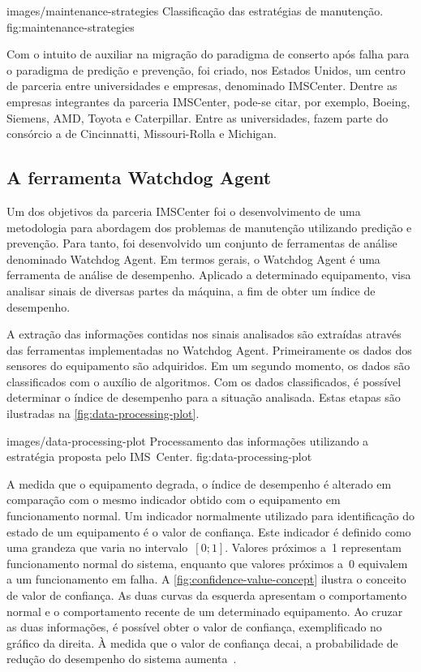     {images/maintenance-strategies}
    {Classificação das estratégias de manutenção.}
    {fig:maintenance-strategies}

Com o intuito de auxiliar na migração do paradigma de conserto após falha para o paradigma de
predição e prevenção, foi criado, nos Estados Unidos, um centro de parceria entre universidades e
empresas, denominado \gls{IMSCenter}. Dentre as empresas integrantes da parceria \gls{IMSCenter},
pode-se citar, por exemplo, Boeing, Siemens, AMD, Toyota e Caterpillar. Entre as universidades,
fazem parte do consórcio a de Cincinnatti, Missouri-Rolla e Michigan.


\subsection{A ferramenta Watchdog Agent}

Um dos objetivos da parceria \gls{IMSCenter} foi o desenvolvimento de uma metodologia para abordagem
dos problemas de manutenção utilizando predição e prevenção. Para tanto, foi desenvolvido um
conjunto de ferramentas de análise denominado Watchdog Agent. Em termos gerais, o Watchdog Agent é
uma ferramenta de análise de desempenho. Aplicado a determinado equipamento, visa analisar sinais de
diversas partes da máquina, a fim de obter um índice de desempenho.

A extração das informações contidas nos sinais analisados são extraídas através das ferramentas
implementadas no Watchdog Agent. Primeiramente os dados dos sensores do equipamento são adquiridos.
Em um segundo momento, os dados são classificados com o auxílio de algoritmos. Com os dados
classificados, é possível determinar o índice de desempenho para a situação analisada. Estas etapas
são ilustradas na \cref{fig:data-processing-plot}.

    {images/data-processing-plot}
    {Processamento das informações utilizando a estratégia proposta pelo IMS~Center.}
    {fig:data-processing-plot}

A medida que o equipamento degrada, o índice de desempenho é alterado em comparação com o mesmo
indicador obtido com o equipamento em funcionamento normal. Um indicador normalmente utilizado para
identificação do estado de um equipamento é o valor de confiança. Este indicador é definido como uma
grandeza que varia no intervalo~${[0; 1]}$. Valores próximos a~\num{1} representam funcionamento
normal do sistema, enquanto que valores próximos a~\num{0} equivalem a um funcionamento em falha. A
\cref{fig:confidence-value-concept} ilustra o conceito de valor de confiança. As duas curvas da
esquerda apresentam o comportamento normal e o comportamento recente de um determinado equipamento.
Ao cruzar as duas informações, é possível obter o valor de confiança, exemplificado no gráfico da
direita. À medida que o valor de confiança decai, a probabilidade de redução do desempenho do
sistema aumenta~\cite{djurdjanovic2003watchdog}.


